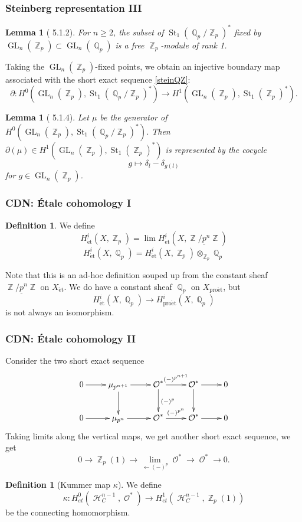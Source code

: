 \documentclass{beamer}
\newtheorem{lem}[thm]{Lemma}
\theoremstyle{definition}
\newtheorem{defn}[thm]{Definition}
\newcommand{\pet}{\operatorname{pro\acute{e}t}}
\newcommand{\et}{\operatorname{\acute{e}t}}
\newcommand{\St}{\operatorname{St}}
\newcommand{\GL}{\operatorname{GL}}
\newcommand{\OO}{\operatorname{\mathcal{O}}}
\newcommand{\ZZ}{\operatorname{\mathbb{Z}}}
\newcommand{\QQ}{\operatorname{\mathbb{Q}}}
\newcommand{\HH}{\operatorname{\mathcal{H}}}
\begin{document}
\begin{frame}
\frametitle{Steinberg representation III}
\begin{lem}[\cite{24} 5.1.2]
	For $n \geq 2$, the subset of $\St_1(\QQ_p/\ZZ_p)^*$ fixed by $\GL_n(\ZZ_p) \subset \GL_n(\QQ_p)$ is a free $\ZZ_p$-module of rank 1. 
\end{lem}
	Taking the $\GL_n(\ZZ_p)$-fixed points, we obtain an injective boundary map associated with the short exact sequence \ref{steinQZ}: $$\partial: H^0(\GL_n(\ZZ_p), \St_1(\QQ_p/\ZZ_p)^*) \to H^1(\GL_n(\ZZ_p), \St_1(\ZZ_p)^*). $$
\begin{lem}[\cite{24} 5.1.4]
	Let $\mu$ be the generator of $H^0(\GL_n(\ZZ_p), \St_1(\QQ_p/\ZZ_p)^*)$. Then $\partial(\mu) \in H^1(\GL_n(\ZZ_p), \St_1(\ZZ_p)^*)$ is represented by the cocycle
	$$g \mapsto \delta_l - \delta_{g(l)}$$ for $g \in \GL_n(\ZZ_p)$.
\end{lem}
\end{frame}

\begin{frame}
\frametitle{CDN: \'Etale cohomology I}
	\begin{defn}We define 
	$$ H^i_{\et}(X, \ZZ_p) = \lim H^i_{\et}(X, \underline{\ZZ/p^n\ZZ})$$
	$$ H^i_{\et}(X, \QQ_p) = H^i_{\et}(X, \ZZ_p) \otimes_{\ZZ_p} \QQ_p$$
\end{defn}
Note that this is an ad-hoc definition souped up from the constant sheaf $\underline{\ZZ/p^n\ZZ}$ on $X_{\et}$. We do have a constant sheaf $\QQ_p$ on $X_{\pet}$, but $$H^i_{\et}(X, \QQ_p) \to H^i_{\pet}(X, \QQ_p)$$ is not always an isomorphism. 
\end{frame}

\begin{frame}
\frametitle{CDN: \'Etale cohomology II}

Consider the two short exact sequence 
	\[ \xymatrix{0 \ar[r] & \mu_{p^{n + 1}} \ar[r] \ar[d] & \OO^* \ar[r]^{(-)^{p^{n + 1}}} \ar[d]^{(-)^p} & \OO^* \ar[r] \ar[d] & 0 \\ 0 \ar[r] & \mu_{p^{n}} \ar[r] & \OO^* \ar[r]^{(-)^{p^{n}}} & \OO^* \ar[r] & 0}  \]
	Taking limits along the vertical maps, we get another short exact sequence, we get \begin{equation} \label{xpes}
 	0 \to \ZZ_p(1) \to \lim_{\leftarrow(-)^p}\OO^* \to \OO^* \to 0.
 \end{equation}
\begin{defn}[Kummer map $\kappa$]
	We define $$\kappa: H_{et}^{0}(\HH_C^{n - 1}, \OO^*) \to H_{et}^{1}(\HH_C^{n - 1}, \ZZ_p(1))$$ be the connecting homomorphism. 
\end{defn}

\end{frame}
\end{document}
